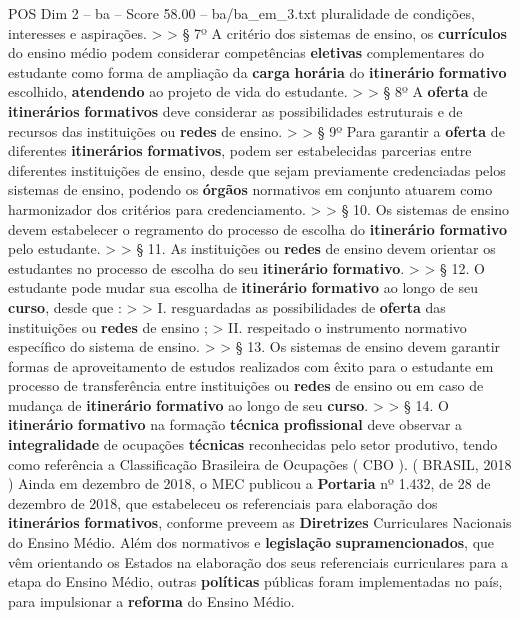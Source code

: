 \begin{textsample}{POS Dim 2 – ba – Score 58.00 – ba/ba\_em\_3.txt}
pluralidade de condições, interesses e aspirações. > > § 7º A critério dos sistemas de ensino, os \textbf{currículos} do ensino médio podem considerar competências \textbf{eletivas} complementares do estudante como forma de ampliação da \textbf{carga} \textbf{horária} do \textbf{itinerário} \textbf{formativo} escolhido, \textbf{atendendo} ao projeto de vida do estudante. > > § 8º A \textbf{oferta} de \textbf{itinerários} \textbf{formativos} deve considerar as possibilidades estruturais e de recursos das instituições ou \textbf{redes} de ensino. > > § 9º Para garantir a \textbf{oferta} de diferentes \textbf{itinerários} \textbf{formativos}, podem ser estabelecidas parcerias entre diferentes instituições de ensino, desde que sejam previamente credenciadas pelos sistemas de ensino, podendo os \textbf{órgãos} normativos em conjunto atuarem como harmonizador dos critérios para credenciamento. > > § 10.
Os sistemas de ensino devem estabelecer o regramento do processo de escolha do \textbf{itinerário} \textbf{formativo} pelo estudante. > > § 11.
As instituições ou \textbf{redes} de ensino devem orientar os estudantes no processo de escolha do seu \textbf{itinerário} \textbf{formativo}. > > § 12.
O estudante pode mudar sua escolha de \textbf{itinerário} \textbf{formativo} ao longo de seu \textbf{curso}, desde que : > > I. resguardadas as possibilidades de \textbf{oferta} das instituições ou \textbf{redes} de ensino ; > II. respeitado o instrumento normativo específico do sistema de ensino. > > § 13.
Os sistemas de ensino devem garantir formas de aproveitamento de estudos realizados com êxito para o estudante em processo de transferência entre instituições ou \textbf{redes} de ensino ou em caso de mudança de \textbf{itinerário} \textbf{formativo} ao longo de seu \textbf{curso}. > > § 14.
O \textbf{itinerário} \textbf{formativo} na formação \textbf{técnica} \textbf{profissional} deve observar a \textbf{integralidade} de ocupações \textbf{técnicas} reconhecidas pelo setor produtivo, tendo como referência a Classificação Brasileira de Ocupações ( CBO ). ( BRASIL, 2018 ) Ainda em dezembro de 2018, o MEC publicou a \textbf{Portaria} nº 1.432, de 28 de dezembro de 2018, que estabeleceu os referenciais para elaboração dos \textbf{itinerários} \textbf{formativos}, conforme preveem as \textbf{Diretrizes} Curriculares Nacionais do Ensino Médio.
Além dos normativos e \textbf{legislação} \textbf{supramencionados}, que vêm orientando os Estados na elaboração dos seus referenciais curriculares para a etapa do Ensino Médio, outras \textbf{políticas} públicas foram implementadas no país, para impulsionar a \textbf{reforma} do Ensino Médio.

\end{textsample}
